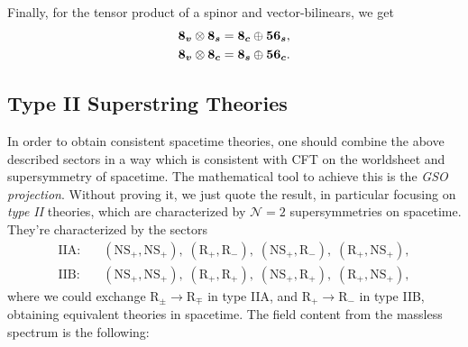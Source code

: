 Finally, for the tensor product of a spinor and vector-bilinears, we get
\begin{subequations}
\begin{align}
    \boldsymbol{8_v} \otimes \boldsymbol{8_s} = \boldsymbol{8_c} \oplus \boldsymbol{56_s} ,\\
    \boldsymbol{8_v} \otimes \boldsymbol{8_c} = \boldsymbol{8_s} \oplus \boldsymbol{56_c} .
\end{align}
\end{subequations}
 
\subsection{Type II Superstring Theories}
In order to obtain consistent spacetime theories, one should combine the above described sectors in a way which is consistent with CFT on the worldsheet and supersymmetry of spacetime. The mathematical tool to achieve this is the \emph{GSO projection}. Without proving it, we just quote the result, in particular focusing on \emph{type II} theories, which are characterized by $\mathcal{N} = 2$ supersymmetries on spacetime. They're characterized by the sectors
\begin{equation}
\begin{aligned}
   \text{IIA}: \quad &(\text{NS}_+, \text{NS}_+),\; (\text{R}_+, \text{R}_-), \;(\text{NS}_+,\text{R}_-),\; (\text{R}_+, \text{NS}_+) , \\
   \text{IIB}: \quad &(\text{NS}_+, \text{NS}_+), \;(\text{R}_+, \text{R}_+), \;(\text{NS}_+,\text{R}_+), \;(\text{R}_+, \text{NS}_+),
\end{aligned}
\end{equation}
where we could exchange $\text{R}_\pm \to \text{R}_\mp$ in type IIA, and $\text{R}_+\to \text{R}_-$ in type IIB, obtaining equivalent theories in spacetime. The field content from the massless spectrum is the following:

